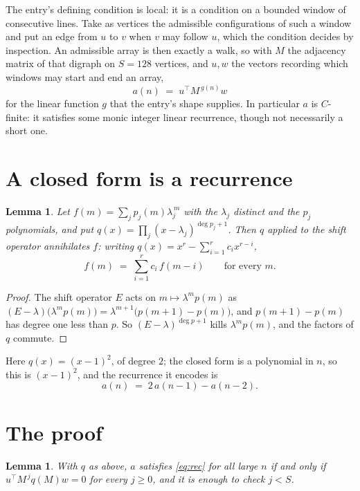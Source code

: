 \documentclass[11pt,a4paper]{article}
\theoremstyle{plain}
\newtheorem{lemma}[theorem]{Lemma}
\theoremstyle{definition}
\begin{document}
The entry's defining condition is local: it is a condition on a bounded window of consecutive lines. Take as vertices the
admissible configurations of such a window and put an edge from $u$ to $v$ when $v$ may
follow $u$, which the condition decides by inspection. An admissible array is then exactly a
walk, so with $M$ the adjacency matrix of that digraph on $S=128$ vertices, and $u,w$ the
vectors recording which windows may start and end an array,
\[
a(n)\;=\;u^{\!\top}M^{\,g(n)}w
\]
for the linear function $g$ that the entry's shape supplies. In particular $a$ is
$C$-finite: it satisfies some monic integer linear recurrence, though not necessarily a short
one.

\section{A closed form is a recurrence}

\begin{lemma}\label{lem:ann}
Let $f(m)=\sum_{j}p_j(m)\lambda_j^{\,m}$ with the $\lambda_j$ distinct and the $p_j$
polynomials, and put $q(x)=\prod_j(x-\lambda_j)^{\deg p_j+1}$. Then $q$ applied to the shift
operator annihilates $f$: writing $q(x)=x^{r}-\sum_{i=1}^{r}c_ix^{r-i}$,
\[
f(m)\;=\;\sum_{i=1}^{r}c_i\,f(m-i)\qquad\text{for every }m.
\]
\end{lemma}

\begin{proof}
The shift operator $E$ acts on $m\mapsto\lambda^{m}p(m)$ as
$(E-\lambda)\bigl(\lambda^{m}p(m)\bigr)=\lambda^{m+1}\bigl(p(m+1)-p(m)\bigr)$, and
$p(m+1)-p(m)$ has degree one less than $p$. So $(E-\lambda)^{\deg p+1}$ kills
$\lambda^{m}p(m)$, and the factors of $q$ commute.
\end{proof}

Here $q(x)=(x-1)^{2}$, of degree $2$; the closed form is a polynomial in $n$, so this is $(x-1)^{2}$, and the recurrence it encodes is
\begin{equation}\label{eq:rec}
a(n)\;=\;2\,a(n-1) - a(n-2).
\end{equation}

\section{The proof}

\begin{lemma}\label{lem:crit}
With $q$ as above, $a$ satisfies \eqref{eq:rec} for all large $n$ if and only if
$u^{\!\top}M^{\,j}q(M)w=0$ for every $j\ge0$, and it is enough to check $j<S$.
\end{lemma}
\end{document}

